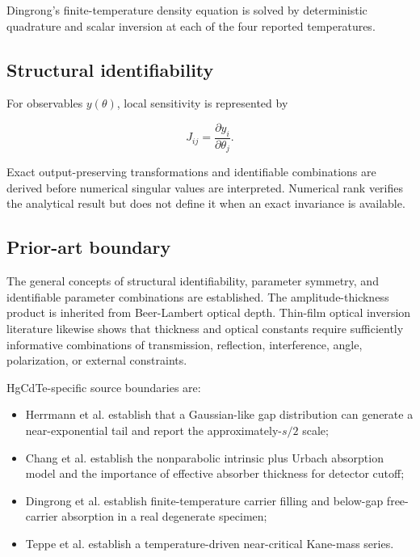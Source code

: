 \documentclass[12pt]{article}
\begin{document}
Dingrong's finite-temperature density equation is solved by deterministic quadrature and scalar inversion at each of the four reported temperatures.

\subsection{Structural identifiability}

For observables $y(\theta)$, local sensitivity is represented by

\[
J_{ij}=\frac{\partial y_i}{\partial\theta_j}.
\]

Exact output-preserving transformations and identifiable combinations are derived before numerical singular values are interpreted. Numerical rank verifies the analytical result but does not define it when an exact invariance is available.

\subsection{Prior-art boundary}

The general concepts of structural identifiability, parameter symmetry, and identifiable parameter combinations are established. The amplitude-thickness product is inherited from Beer-Lambert optical depth. Thin-film optical inversion literature likewise shows that thickness and optical constants require sufficiently informative combinations of transmission, reflection, interference, angle, polarization, or external constraints. \cite{chambouleyron_1997,babeva_kitova_konstantinov_2001_error,babeva_kitova_konstantinov_2001_unique,mendoza_galvan_2021}

HgCdTe-specific source boundaries are:

\begin{itemize}
\item Herrmann et al. establish that a Gaussian-like gap distribution can generate a near-exponential tail and report the approximately-$s/2$ scale; \cite{herrmann_1992}
\item Chang et al. establish the nonparabolic intrinsic plus Urbach absorption model and the importance of effective absorber thickness for detector cutoff; \cite{chang_2006,chang_2007}
\item Dingrong et al. establish finite-temperature carrier filling and below-gap free-carrier absorption in a real degenerate specimen; \cite{dingrong_1985}
\item Teppe et al. establish a temperature-driven near-critical Kane-mass series. \cite{teppe_2016}
\end{itemize}
\end{document}
